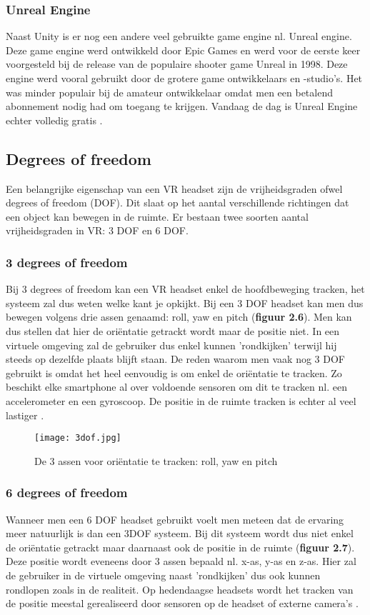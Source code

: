 \subsubsection{Unreal Engine}
Naast Unity is er nog een andere veel gebruikte game engine nl. Unreal engine. Deze game engine werd ontwikkeld door Epic Games en werd voor de eerste keer voorgesteld bij de release van de populaire shooter game Unreal in 1998. Deze engine werd vooral gebruikt door de grotere game ontwikkelaars en -studio's. Het was minder populair bij de amateur ontwikkelaar omdat men een betalend abonnement nodig had om toegang te krijgen. Vandaag de dag is Unreal Engine echter volledig gratis \autocite{Sutorcen2016}.

\subsection{Degrees of freedom}

Een belangrijke eigenschap van een VR headset zijn de vrijheidsgraden ofwel degrees of freedom (DOF). Dit slaat op het aantal verschillende richtingen dat een object kan bewegen in de ruimte. Er bestaan twee soorten aantal vrijheidsgraden in VR: 3 DOF en 6 DOF. 

\subsubsection{3 degrees of freedom}
Bij 3 degrees of freedom kan een VR headset enkel de hoofdbeweging tracken, het systeem zal dus weten welke kant je opkijkt. Bij een 3 DOF headset kan men dus bewegen volgens drie assen genaamd: roll, yaw en pitch (\textbf{figuur 2.6}). Men kan dus stellen dat hier de oriëntatie getrackt wordt maar de positie niet. In een virtuele omgeving zal de gebruiker dus enkel kunnen 'rondkijken' terwijl hij steeds op dezelfde plaats blijft staan. De reden waarom men vaak nog 3 DOF gebruikt is omdat het heel eenvoudig is om enkel de oriëntatie te tracken. Zo beschikt elke smartphone al over voldoende sensoren om dit te tracken nl. een accelerometer en een gyroscoop. De positie in de ruimte tracken is echter al veel lastiger \autocite{Weis2018}.

\begin{figure}[h]
    \centering
    \texttt{[image: 3dof.jpg]}
    \caption{De 3 assen voor oriëntatie te tracken: roll, yaw en pitch \autocite{Lang2013}}
\end{figure}

\subsubsection{6 degrees of freedom}
Wanneer men een 6 DOF headset gebruikt voelt men meteen dat de ervaring meer natuurlijk is dan een 3DOF systeem. Bij dit systeem wordt dus niet enkel de oriëntatie getrackt maar daarnaast ook de positie in de ruimte (\textbf{figuur 2.7}). Deze positie wordt eveneens door 3 assen bepaald nl. x-as, y-as en z-as. Hier zal de gebruiker in de virtuele omgeving naast 'rondkijken' dus ook kunnen rondlopen zoals in de realiteit. Op hedendaagse headsets wordt het tracken van de positie meestal gerealiseerd door sensoren op de headset of externe camera's \autocite{Weis2018}.

